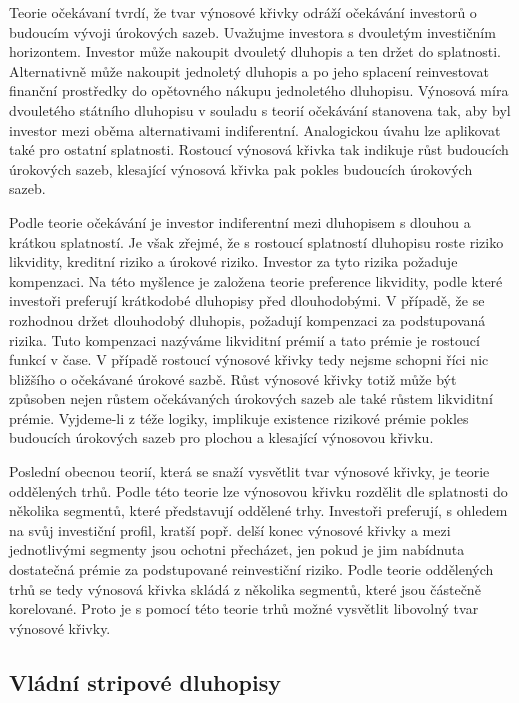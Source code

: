 \documentclass[a4paper]{book}
\begin{document}
Teorie očekávaní tvrdí, že tvar výnosové křivky odráží očekávání investorů o budoucím vývoji úrokových sazeb. Uvažujme investora s dvouletým investičním horizontem. Investor může nakoupit dvouletý dluhopis a ten držet do splatnosti. Alternativně může nakoupit jednoletý dluhopis a po jeho splacení reinvestovat finanční prostředky do opětovného nákupu jednoletého dluhopisu. Výnosová míra dvouletého státního dluhopisu v souladu s teorií očekávání stanovena tak, aby byl investor mezi oběma alternativami indiferentní. Analogickou úvahu lze aplikovat také pro ostatní splatnosti. Rostoucí výnosová křivka tak indikuje růst budoucích úrokových sazeb, klesající výnosová křivka pak pokles budoucích úrokových sazeb. 

Podle teorie očekávání je investor indiferentní mezi dluhopisem s dlouhou a krátkou splatností. Je však zřejmé, že s rostoucí splatností dluhopisu roste riziko likvidity, kreditní riziko a úrokové riziko. Investor za tyto rizika požaduje kompenzaci. Na této myšlence je založena teorie preference likvidity, podle které investoři preferují krátkodobé dluhopisy před dlouhodobými. V případě, že se rozhodnou držet dlouhodobý dluhopis, požadují kompenzaci za podstupovaná rizika. Tuto kompenzaci nazýváme likviditní prémií a tato prémie je rostoucí funkcí v čase. V případě rostoucí výnosové křivky tedy nejsme schopni říci nic bližšího o očekávané úrokové sazbě. Růst výnosové křivky totiž může být způsoben nejen růstem očekávaných úrokových sazeb ale také růstem likviditní prémie. Vyjdeme-li z téže logiky, implikuje existence rizikové prémie pokles budoucích úrokových sazeb pro plochou a klesající výnosovou křivku.

Poslední obecnou teorií, která se snaží vysvětlit tvar výnosové křivky, je teorie oddělených trhů. Podle této teorie lze výnosovou křivku rozdělit dle splatnosti do několika segmentů, které představují oddělené trhy. Investoři preferují, s ohledem na svůj investiční profil, kratší popř. delší konec výnosové křivky a mezi jednotlivými segmenty jsou ochotni přecházet, jen pokud je jim nabídnuta dostatečná prémie za podstupované reinvestiční riziko. Podle teorie oddělených trhů se tedy výnosová křivka skládá z několika segmentů, které jsou částečně korelované. Proto je s pomocí této teorie trhů možné vysvětlit libovolný tvar výnosové křivky.

\subsection{Vládní stripové dluhopisy}
\end{document}
